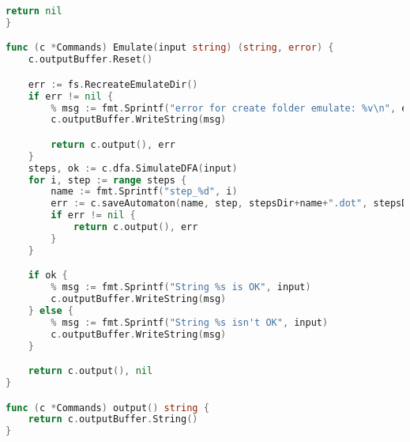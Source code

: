 \begin{lstlisting}[language=Go, caption={Код модуля \textit{commands}}, label=lst1]
	return nil
}

func (c *Commands) Emulate(input string) (string, error) {
	c.outputBuffer.Reset()

	err := fs.RecreateEmulateDir()
	if err != nil {
		% msg := fmt.Sprintf("error for create folder emulate: %v\n", err)
		c.outputBuffer.WriteString(msg)

		return c.output(), err
	}
	steps, ok := c.dfa.SimulateDFA(input)
	for i, step := range steps {
		name := fmt.Sprintf("step_%d", i)
		err := c.saveAutomaton(name, step, stepsDir+name+".dot", stepsDir+name+".png")
		if err != nil {
			return c.output(), err
		}
	}

	if ok {
		% msg := fmt.Sprintf("String %s is OK", input)
		c.outputBuffer.WriteString(msg)
	} else {
		% msg := fmt.Sprintf("String %s isn't OK", input)
		c.outputBuffer.WriteString(msg)
	}

	return c.output(), nil
}

func (c *Commands) output() string {
	return c.outputBuffer.String()
}
\end{lstlisting}

